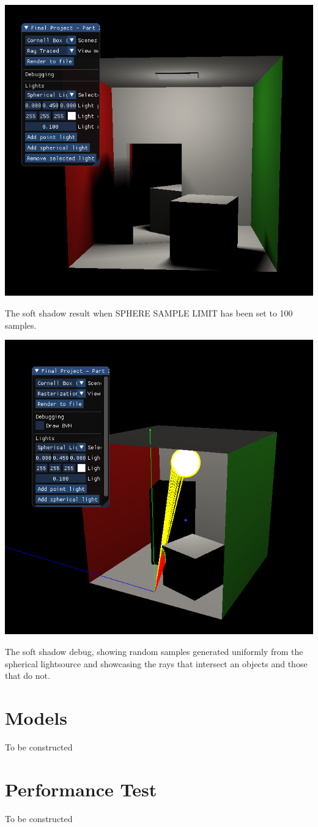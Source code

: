 \documentclass{article}
\begin{document}
    \begin{center}
        \includegraphics[scale=0.70]{images/softshadow_showcase.png}

        The soft shadow result when SPHERE SAMPLE LIMIT has been set to 100 samples.

        \includegraphics[scale=0.70]{images/softshadowdebug.png}

        The soft shadow debug, showing random samples generated uniformly from the spherical lightsource and showcasing the rays that intersect an objects and those that do not.  

    \end{center}

    \section{Models}
    To be constructed

    \section{Performance Test}
    To be constructed
\end{document}
